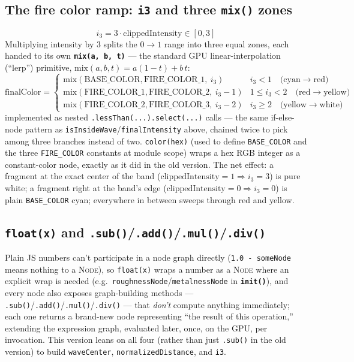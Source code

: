 \documentclass[11pt]{article}
\newcommand{\code}[1]{\texttt{#1}}
\newcommand{\func}[1]{\texttt{\textbf{#1}}}
\newcommand{\type}[1]{\textsc{#1}}
\begin{document}
\subsection*{The fire color ramp: \code{i3} and three \func{mix()} zones}
\[
  i_3 = 3 \cdot \text{clippedIntensity} \in [0, 3]
\]
Multiplying intensity by $3$ splits the $0\to1$ range into three equal zones, each handed
to its own \func{mix(a, b, t)} --- the standard GPU linear-interpolation (``lerp'')
primitive, $\mathrm{mix}(a,b,t) = a(1-t) + b\,t$:
\[
  \text{finalColor} =
  \begin{cases}
    \mathrm{mix}(\text{BASE\_COLOR}, \text{FIRE\_COLOR\_1},\ i_3) & i_3 < 1
      \quad\text{(cyan} \to \text{red)} \\[2pt]
    \mathrm{mix}(\text{FIRE\_COLOR\_1}, \text{FIRE\_COLOR\_2},\ i_3-1) & 1 \le i_3 < 2
      \quad\text{(red} \to \text{yellow)} \\[2pt]
    \mathrm{mix}(\text{FIRE\_COLOR\_2}, \text{FIRE\_COLOR\_3},\ i_3-2) & i_3 \ge 2
      \quad\text{(yellow} \to \text{white)}
  \end{cases}
\]
implemented as nested \code{.lessThan(...).select(...)} calls --- the same if-else-node
pattern as \code{isInsideWave}/\code{finalIntensity} above, chained twice to pick among
three branches instead of two. \code{color(hex)} (used to define \code{BASE\_COLOR} and the
three \code{FIRE\_COLOR} constants at module scope) wraps a hex RGB integer as a
constant-color node, exactly as it did in the old version. The net effect: a fragment at the
exact center of the band ($\text{clippedIntensity}=1 \Rightarrow i_3=3$) is pure white; a
fragment right at the band's edge ($\text{clippedIntensity}=0 \Rightarrow i_3=0$) is plain
\code{BASE\_COLOR} cyan; everywhere in between sweeps through red and yellow.

\subsection*{\func{float(x)} and \func{.sub()}/\func{.add()}/\func{.mul()}/\func{.div()}}
Plain JS numbers can't participate in a node graph directly (\code{1.0 - someNode} means
nothing to a \type{Node}), so \code{float(x)} wraps a number as a \type{Node} where an
explicit wrap is needed (e.g.\ \code{roughnessNode}/\code{metalnessNode} in
\func{init()}), and every node also exposes graph-building methods ---
\code{.sub()}/\code{.add()}/\code{.mul()}/\code{.div()} --- that \emph{don't} compute
anything immediately; each one returns a brand-new node representing ``the result of this
operation,'' extending the expression graph, evaluated later, once, on the GPU, per
invocation. This version leans on all four (rather than just \code{.sub()} in the old
version) to build \code{waveCenter}, \code{normalizedDistance}, and \code{i3}.
\end{document}

